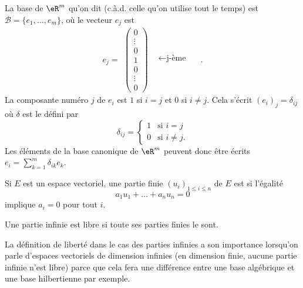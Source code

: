 La base de $\eR^m$ qu'on dit  (c.à.d. celle qu'on utilise tout le temps) est $\mathcal{B}=\{e_1,\ldots, e_m\}$, où le vecteur $e_j$ est 
\begin{equation}\nonumber
  e_j=
\begin{array}{cc}
  \begin{pmatrix}
    0\\\vdots\\0\\1\\ 0\\\vdots\\0
  \end{pmatrix} & 
  \begin{matrix}
    \quad\\\quad\\\leftarrow\textrm{j-ème} \quad\\\quad\\\quad\\
  \end{matrix}
\end{array}.
\end{equation}
La composante numéro $j$ de $e_i$ est $1$ si $i=j$ et $0$ si $i\neq j$. Cela s'écrit $(e_i)_j=\delta_{ij}$ où $\delta$ est le  défini par
\begin{equation}
	\delta_{ij}=\begin{cases}
		1	&	\text{si $i=j$}\\
		0	&	 \text{si $i\neq j$.}
	\end{cases}
\end{equation}
Les éléments de la base canonique de $\eR^m$ peuvent donc être écrits $e_i=\sum_{k=1}^m\delta_{ik}e_k$.


\begin{definition}
    Si \( E\) est un espace vectoriel, une partie finie \( (u_i)_{1\leq i\leq n}\) de \( E\) est  si l'égalité
    \begin{equation}
        a_1 u_1+\ldots +a_nu_n=0
    \end{equation}
    implique \( a_i=0\) pour tout \( i\).

    Une partie infinie est libre si toute ses parties finies le sont.
\end{definition}
La définition de liberté dans le cas des parties infinies a son importance lorsqu'on parle d'espaces vectoriels de dimension infinies (en dimension finie, aucune partie infinie n'est libre) parce que cela fera une différence entre une base algébrique et une base hilbertienne par exemple.

